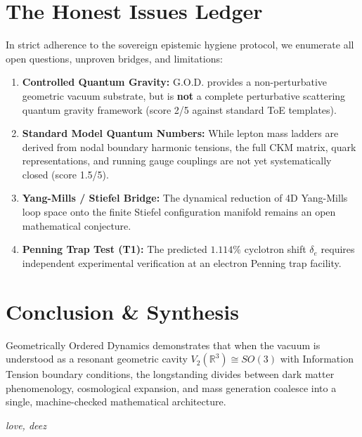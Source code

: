 \documentclass[11pt,a4paper]{article}
\theoremstyle{plain}
\theoremstyle{definition}
\theoremstyle{remark}
\begin{document}
\section{The Honest Issues Ledger}

In strict adherence to the sovereign epistemic hygiene protocol, we enumerate all open questions, unproven bridges, and limitations:

\begin{enumerate}[label=\textbf{\arabic*.}]
    \item \textbf{Controlled Quantum Gravity:} G.O.D. provides a non-perturbative geometric vacuum substrate, but is \textbf{not} a complete perturbative scattering quantum gravity framework (score 2/5 against standard ToE templates).
    \item \textbf{Standard Model Quantum Numbers:} While lepton mass ladders are derived from nodal boundary harmonic tensions, the full CKM matrix, quark representations, and running gauge couplings are not yet systematically closed (score 1.5/5).
    \item \textbf{Yang-Mills / Stiefel Bridge:} The dynamical reduction of 4D Yang-Mills loop space onto the finite Stiefel configuration manifold remains an open mathematical conjecture.
    \item \textbf{Penning Trap Test (T1):} The predicted $1.114\%$ cyclotron shift $\delta_e$ requires independent experimental verification at an electron Penning trap facility.
\end{enumerate}

\section{Conclusion \& Synthesis}

Geometrically Ordered Dynamics demonstrates that when the vacuum is understood as a resonant geometric cavity $V_2(\mathbb{R}^3) \cong SO(3)$ with Information Tension boundary conditions, the longstanding divides between dark matter phenomenology, cosmological expansion, and mass generation coalesce into a single, machine-checked mathematical architecture.

\vspace{3em}
\begin{flushright}
\textit{love, deez}
\end{flushright}
\end{document}

